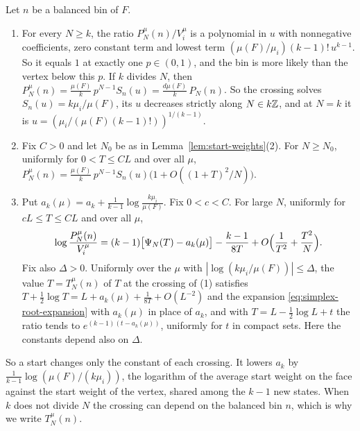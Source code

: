 \begin{theorem}\label{thm:start-crossings}
Let $n$ be a balanced bin of $F$.
\begin{enumerate}[(1)]
\item For every $N\ge k$, the ratio $P^\mu_N(n)/V^\mu_i$ is a polynomial in $u$
with nonnegative coefficients, zero constant term and lowest term
$(\mu(F)/\mu_i)(k-1)!\,u^{k-1}$. So it equals $1$ at exactly one $p\in(0,1)$, and
the bin is more likely than the vertex below this $p$. If $k$ divides $N$, then
$P^\mu_N(n)=\frac{\mu(F)}k\,p^{N-1}S_n(u)=\frac{d\mu(F)}k\,P_N(n)$.
So the crossing solves $S_n(u)=k\mu_i/\mu(F)$, its $u$ decreases strictly along
$N\in k\mathbb Z$, and at $N=k$ it is $u=(\mu_i/(\mu(F)(k-1)!))^{1/(k-1)}$.
\item Fix $C>0$ and let $N_0$ be as in Lemma~\ref{lem:start-weights}(2). For
$N\ge N_0$, uniformly for $0<T\le CL$ and over all $\mu$,
$P^\mu_N(n)=\frac{\mu(F)}k\,p^{N-1}S_n(u)\bigl(1+O((1+T)^2/N)\bigr)$.
\item Put $a_k(\mu)=a_k+\frac1{k-1}\log\frac{k\mu_i}{\mu(F)}$. Fix $0<c<C$. For
large $N$, uniformly for $cL\le T\le CL$ and over all $\mu$,
\[
 \log\frac{P^\mu_N(n)}{V^\mu_i}=(k-1)\bigl[\Psi_N(T)-a_k(\mu)\bigr]
 -\frac{k-1}{8T}+O\Bigl(\frac1{T^2}+\frac{T^2}N\Bigr).
\]
Fix also $\Delta>0$. Uniformly over the $\mu$ with $|\log(k\mu_i/\mu(F))|\le\Delta$, the
value $T=T^\mu_N(n)$ of $T$ at the crossing of (1) satisfies
$T+\frac12\log T=L+a_k(\mu)+\frac1{8T}+O(L^{-2})$ and the expansion
\eqref{eq:simplex-root-expansion} with $a_k(\mu)$ in place of $a_k$, and with
$T=L-\frac12\log L+t$ the ratio tends to $e^{(k-1)(t-a_k(\mu))}$, uniformly for
$t$ in compact sets. Here the constants depend also on $\Delta$.
\end{enumerate}
\end{theorem}

So a start changes only the constant of each crossing. It lowers $a_k$
by $\frac1{k-1}\log(\mu(F)/(k\mu_i))$, the logarithm of the average start
weight on the face against the start weight of the vertex, shared among the
$k-1$ new states. When $k$ does not divide $N$ the crossing can depend on the
balanced bin $n$, which is why we write $T^\mu_N(n)$.

